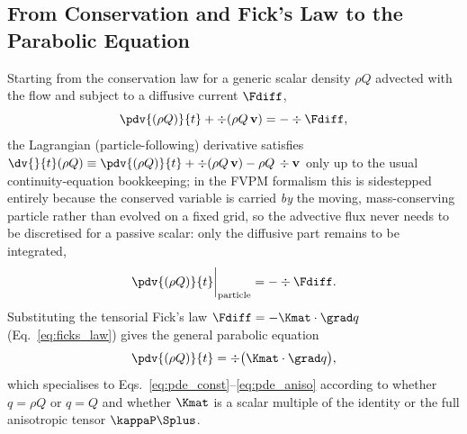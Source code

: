 \subsection{From Conservation and Fick's Law to the Parabolic Equation}
\label{app:derivation-pde}
Starting from the conservation law for a generic scalar density
$\rho Q$ advected with the flow and subject to a diffusive current
$\Fdiff$,
\begin{equation}
  \pdv{(\rho Q)}{t} + \div(\rho Q\,\mathbf v) = -\div\Fdiff ,
\end{equation}
the Lagrangian (particle-following) derivative satisfies
$\dv{}{t}(\rho Q) \equiv \pdv{(\rho Q)}{t} + \div(\rho Q\,\mathbf v) - \rho Q\,\div\mathbf v$
only up to the usual continuity-equation bookkeeping; in the FVPM
formalism this is sidestepped entirely because the conserved variable is
carried \emph{by} the moving, mass-conserving particle rather than
evolved on a fixed grid, so the advective flux never needs to be
discretised for a passive scalar: only the diffusive part remains to be
integrated,
\begin{equation}
  \pdv{(\rho Q)}{t}\bigg|_{\rm particle} = -\div\Fdiff .
\end{equation}
Substituting the tensorial Fick's law $\Fdiff = -\Kmat\cdot\grad q$
(Eq.~\eqref{eq:ficks_law}) gives the general parabolic equation
\begin{equation}
  \pdv{(\rho Q)}{t} = \div\big(\Kmat\cdot\grad q\big) ,
\end{equation}
which specialises to Eqs.~\eqref{eq:pde_const}--\eqref{eq:pde_aniso}
according to whether $q=\rho Q$ or $q=Q$ and whether $\Kmat$ is a scalar
multiple of the identity or the full anisotropic tensor $\kappaP\Splus$.


